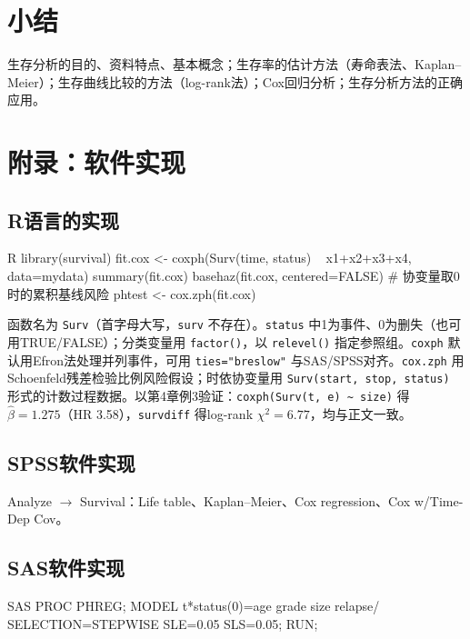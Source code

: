 \section*{小结}
生存分析的目的、资料特点、基本概念；生存率的估计方法（寿命表法、Kaplan--Meier）；生存曲线比较的方法（log-rank法）；Cox回归分析；生存分析方法的正确应用。
\section{附录：软件实现}
\subsection{R语言的实现}
\par\noindent
\begin{coursecode}{R}
library(survival)
fit.cox <- coxph(Surv(time, status) ~ x1+x2+x3+x4, data=mydata)
summary(fit.cox)
basehaz(fit.cox, centered=FALSE)   # 协变量取0时的累积基线风险
phtest <- cox.zph(fit.cox)
\end{coursecode}
\par
\begin{annotation}函数名为 \texttt{Surv}（首字母大写，\texttt{surv} 不存在）。\texttt{status} 中1为事件、0为删失（也可用TRUE/FALSE）；分类变量用 \texttt{factor()}，以 \texttt{relevel()} 指定参照组。\texttt{coxph} 默认用Efron法处理并列事件，可用 \texttt{ties="breslow"} 与SAS/SPSS对齐。\texttt{cox.zph} 用Schoenfeld残差检验比例风险假设；时依协变量用 \texttt{Surv(start, stop, status)} 形式的计数过程数据。以第4章例3验证：\texttt{coxph(Surv(t, e) \textasciitilde{} size)} 得 $\widehat\beta=1.275$（HR 3.58），\texttt{survdiff} 得log-rank $\chi^2=6.77$，均与正文一致。\end{annotation}
\subsection{SPSS软件实现}
Analyze $\to$ Survival：Life table、Kaplan--Meier、Cox regression、Cox w/Time-Dep Cov。
\subsection{SAS软件实现}
\par\noindent
\begin{coursecode}{SAS}
PROC PHREG;
MODEL t*status(0)=age grade size relapse/
  SELECTION=STEPWISE SLE=0.05 SLS=0.05;
RUN;
\end{coursecode}
\par
{}
